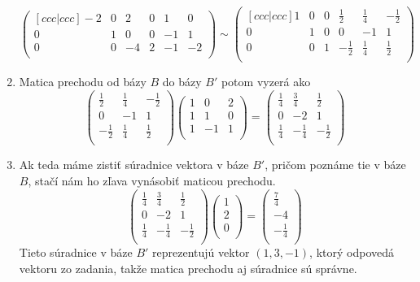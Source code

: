 \begin{enumerate}
\[\begin{pmatrix}[ccc|ccc]
        -2 & 0 & 2 & 0 & 1 & 0 \\
        0 & 1 & 0 & 0 & -1 & 1 \\
        0 & 0 & -4 & 2 & -1 & -2 \\
      \end{pmatrix}
      \sim
      \begin{pmatrix}[ccc|ccc]
        1 & 0 & 0 & \frac{1}{2} & \frac{1}{4} & -\frac{1}{2} \\
        0 & 1 & 0 & 0 & -1 & 1 \\
        0 & 0 & 1 & -\frac{1}{2} & \frac{1}{4} & \frac{1}{2} \\
      \end{pmatrix}\]
    \item Matica prechodu od bázy $B$ do bázy $B'$ potom vyzerá ako
    \[\begin{pmatrix}
        \frac{1}{2} & \frac{1}{4} & -\frac{1}{2} \\
        0 & -1 & 1 \\
        -\frac{1}{2} & \frac{1}{4} & \frac{1}{2} \\
      \end{pmatrix}
      \begin{pmatrix}
        1 & 0 & 2 \\
        1 & 1 & 0 \\
        1 & -1 & 1 \\
      \end{pmatrix}
      =
      \begin{pmatrix}
        \frac{1}{4} & \frac{3}{4} & \frac{1}{2} \\
        0 & -2 & 1 \\
        \frac{1}{4} & -\frac{1}{4} & -\frac{1}{2} \\
      \end{pmatrix}\]
    \item Ak teda máme zistiť súradnice vektora v báze $B'$, pričom 
    poznáme tie v báze $B$, stačí nám ho zľava vynásobiť maticou 
    prechodu.
    \[\begin{pmatrix}
        \frac{1}{4} & \frac{3}{4} & \frac{1}{2} \\
        0 & -2 & 1 \\
        \frac{1}{4} & -\frac{1}{4} & -\frac{1}{2} \\
      \end{pmatrix}
      \begin{pmatrix}
        1 \\
        2 \\
        0 \\
      \end{pmatrix}
      =
      \begin{pmatrix}
        \frac{7}{4} \\
        -4 \\
        -\frac{1}{4} \\
      \end{pmatrix}\]
    Tieto súradnice v báze $B'$ reprezentujú vektor $(1, 3, -1)$, ktorý 
    odpovedá vektoru zo zadania, takže matica prechodu aj súradnice sú 
    správne.
\end{enumerate}

